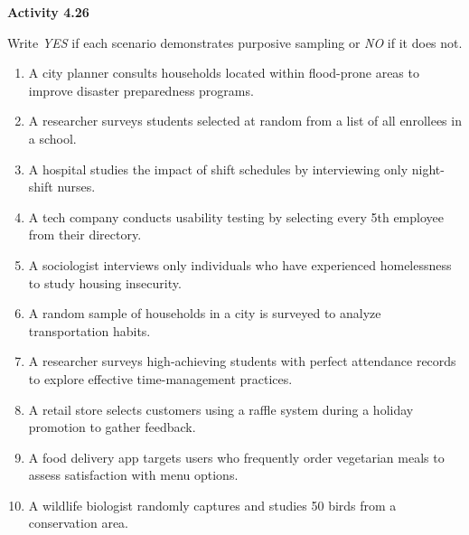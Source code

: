 \vspace{0.3ex}
\noindent\textbf{Activity 4.26}

\vspace{0.2ex}

Write \emph{YES} if each scenario demonstrates purposive sampling or \emph{NO} if it does not.

\begin{enumerate}
    \item A city planner consults households located within flood-prone areas to improve disaster preparedness programs.
    \item A researcher surveys students selected at random from a list of all enrollees in a school.
    \item A hospital studies the impact of shift schedules by interviewing only night-shift nurses.
    \item A tech company conducts usability testing by selecting every 5th employee from their directory.
    \item A sociologist interviews only individuals who have experienced homelessness to study housing insecurity.
    \item A random sample of households in a city is surveyed to analyze transportation habits.
    \item A researcher surveys high-achieving students with perfect attendance records to explore effective time-management practices.
    \item A retail store selects customers using a raffle system during a holiday promotion to gather feedback.
    \item A food delivery app targets users who frequently order vegetarian meals to assess satisfaction with menu options.
    \item A wildlife biologist randomly captures and studies 50 birds from a conservation area.
\end{enumerate}
